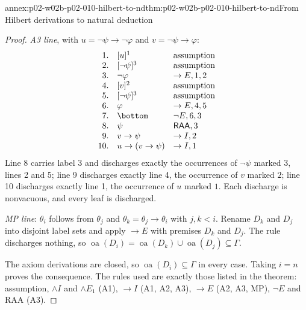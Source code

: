 \begin{annexitem}{annex:p02-w02b-p02-010-hilbert-to-nd}{thm:p02-w02b-p02-010-hilbert-to-nd}{From Hilbert derivations to natural deduction}
\begin{proof}
\emph{A3 line}, with \(u=\neg\psi\to\neg\varphi\) and
\(v=\neg\psi\to\varphi\):
\[
\begin{array}{rll}
1.&[u]^1&\text{assumption}\\
2.&[\neg\psi]^3&\text{assumption}\\
3.&\neg\varphi&\to E,1,2\\
4.&[v]^2&\text{assumption}\\
5.&[\neg\psi]^3&\text{assumption}\\
6.&\varphi&\to E,4,5\\
7.&\bottom&\neg E,6,3\\
8.&\psi&\mathsf{RAA},3\\
9.&v\to\psi&\to I,2\\
10.&u\to(v\to\psi)&\to I,1
\end{array}
\]
Line 8 carries label \(3\) and discharges exactly the occurrences of
\(\neg\psi\) marked \(3\), lines 2 and 5; line 9 discharges exactly line 4,
the occurrence of \(v\) marked \(2\); line 10 discharges exactly line 1, the
occurrence of \(u\) marked \(1\).  Each discharge is nonvacuous, and every
leaf is discharged.

\emph{MP line}: \(\theta_i\) follows from \(\theta_j\) and
\(\theta_k=\theta_j\to\theta_i\) with \(j,k<i\).  Rename \(D_k\) and \(D_j\)
into disjoint label sets and apply \(\to E\) with premises \(D_k\) and
\(D_j\).  The rule discharges nothing, so
\(\operatorname{oa}(D_i)=\operatorname{oa}(D_k)\cup\operatorname{oa}(D_j)\subseteq\Gamma\).

The axiom derivations are closed, so \(\operatorname{oa}(D_i)\subseteq\Gamma\)
in every case.  Taking \(i=n\) proves the consequence.  The rules used are
exactly those listed in the theorem: assumption, \(\land I\) and
\(\land E_1\) (A1), \(\to I\) (A1, A2, A3), \(\to E\) (A2, A3, MP),
\(\neg E\) and RAA (A3).
\end{proof}
\end{annexitem}

